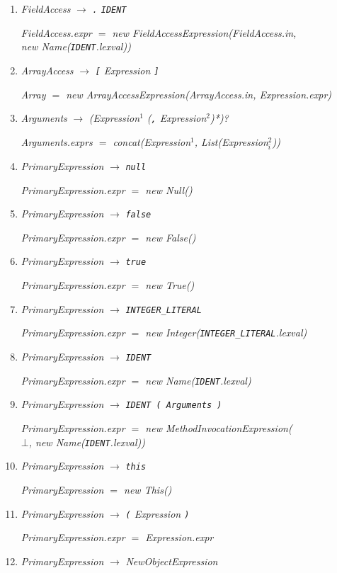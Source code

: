 \documentclass[12pt,a4paper]{scrartcl}
\renewcommand{\prod}[2]{\textit{#1} $\rightarrow$ \textit{#2}}
\newcommand{\tok}[1]{\textnormal{\texttt{#1}}}
\newcommand{\assign}[2]{\textit{#1} $=$ #2}
\newcommand{\List}[1]{\textnormal{List(\textit{#1})}}
\newcommand{\concat}[1]{\textnormal{concat(\textit{#1})}}
\newcommand{\new}[2]{\textnormal{new #1(\textit{#2})}}
\newcommand{\attr}[1]{\parbox{\linewidth}{\raggedleft \textit{#1}}}
\begin{document}
\begin{enumerate}
    \item \prod{FieldAccess}{\tok{.} \tok{IDENT}}\\
        \attr{\assign{FieldAccess.expr}{\new{FieldAccessExpression}{FieldAccess.in, \\\new{Name}{\tok{IDENT}.lexval}}}}
    \item \prod{ArrayAccess}{\tok{[} Expression \tok{]}}\\
        \attr{\assign{Array}{\new{ArrayAccessExpression}{ArrayAccess.in, Expression.expr}}}
    \item \prod{Arguments}{(Expression$^1$ (\tok{,} Expression$^2$)*)?}\\
        \attr{\assign{Arguments.exprs}{\concat{Expression$^1$, \List{Expression$^2_i$}}}}
    \item \prod{PrimaryExpression}{\tok{null}}\\
        \attr{\assign{PrimaryExpression.expr}{\new{Null}{}}}
    \item \prod{PrimaryExpression}{\tok{false}}\\
        \attr{\assign{PrimaryExpression.expr}{\new{False}{}}}
    \item \prod{PrimaryExpression}{\tok{true}}\\
        \attr{\assign{PrimaryExpression.expr}{\new{True}{}}}
    \item \prod{PrimaryExpression}{\tok{INTEGER\_LITERAL}}\\
        \attr{\assign{PrimaryExpression.expr}{\new{Integer}{\tok{INTEGER\_LITERAL}.lexval}}}
    \item \prod{PrimaryExpression}{\tok{IDENT}}\\
        \attr{\assign{PrimaryExpression.expr}{\new{Name}{\tok{IDENT}.lexval}}}
    \item \prod{PrimaryExpression}{\tok{IDENT \tok{(} Arguments \tok{)}}}\\
        \attr{\assign{PrimaryExpression.expr}{\new{MethodInvocationExpression}{\\$\bot$, \new{Name}{\tok{IDENT}.lexval}}}}
    \item \prod{PrimaryExpression}{\tok{this}}\\
        \attr{\assign{PrimaryExpression}{\new{This}{}}}
    \item \prod{PrimaryExpression}{\tok{(} Expression \tok{)}}\\
        \attr{\assign{PrimaryExpression.expr}{Expression.expr}}
    \item \prod{PrimaryExpression}{NewObjectExpression}\\

\end{enumerate}
\end{document}
